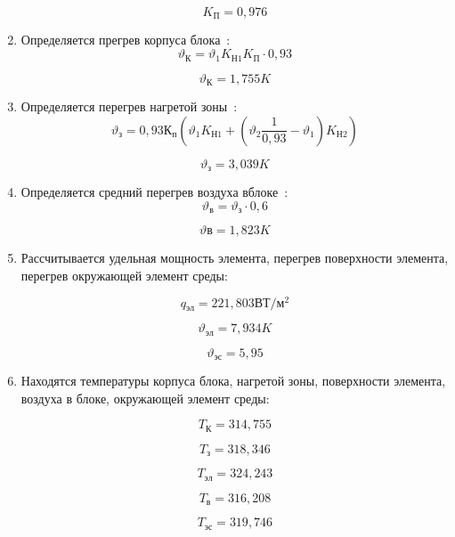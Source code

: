 \begin{enumerate}[label={\arabic*.}]
  $$K\mathrm{_П} = 0,976$$

\item Определяется прегрев корпуса блока~\cite{Rotkop1976}:
  \begin{equation}
    \vartheta\mathrm{_К} = \vartheta_1K\mathrm{_{Н1}}K\mathrm{_П} \cdot 0,93
  \end{equation}

  $$\vartheta\mathrm{_К} =1,755K$$

\item Определяется перегрев нагретой зоны~\cite{Rotkop1976}:
  \begin{equation}
\vartheta\mathrm{_з} = 0,93К\mathrm{_п}(\vartheta_1K\mathrm{_{Н1}} + (\vartheta_2\frac{1}{0,93} - \vartheta_1)K\mathrm{_{Н2}})
\end{equation}

$$\vartheta\mathrm{_з} = 3,039 K$$

\item Определяется средний перегрев воздуха вблоке~\cite{Rotkop1976}:
\begin{equation}
\vartheta\mathrm{_в} = \vartheta\mathrm{_з} \cdot 0,6
\end{equation}

$$\vartheta\mathrm{в} = 1,823 K$$


\item Рассчитывается удельная мощность элемента,
  перегрев поверхности элемента,
  перегрев окружающей элемент среды:

$$q\mathrm{_{эл}}= 221,803\mathrm{ВТ/м^2}$$

$$\vartheta\mathrm{_{эл}} = 7,934K$$

$$\vartheta\mathrm{_{эс}} = 5,95$$

\item Находятся температуры
  корпуса блока,
  нагретой зоны,
  поверхности элемента,
  воздуха в блоке,
  окружающей элемент среды:

  
$$T\mathrm{_К} = 314,755$$

$$T\mathrm{_з} = 318,346$$

$$T\mathrm{_{эл}} = 324,243$$

$$T\mathrm{_{в}} = 316,208$$

$$T\mathrm{_{эс}} = 319,746$$


\end{enumerate}